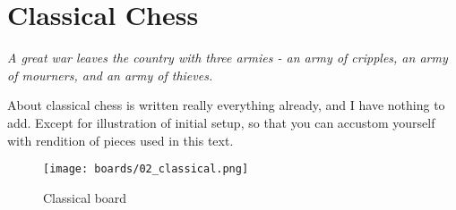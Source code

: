 

\chapter*{Classical Chess}
\label{ch:Classical Chess}

\begin{flushright}
\parbox{0.8\textwidth}{
\emph{A great war leaves the country with three armies -
an army of cripples, an army of mourners, and an army of thieves. \newline
{} } }
\end{flushright}

\noindent
About classical chess is written really everything already, and I
have nothing to add. Except for illustration of initial setup, so that
you can accustom yourself with rendition of pieces used in this text.

\noindent
\begin{figure}[t]
\texttt{[image: boards/02\_classical.png]}
\caption{Classical board}
\label{fig:02_classical}
\end{figure}

\clearpage %
